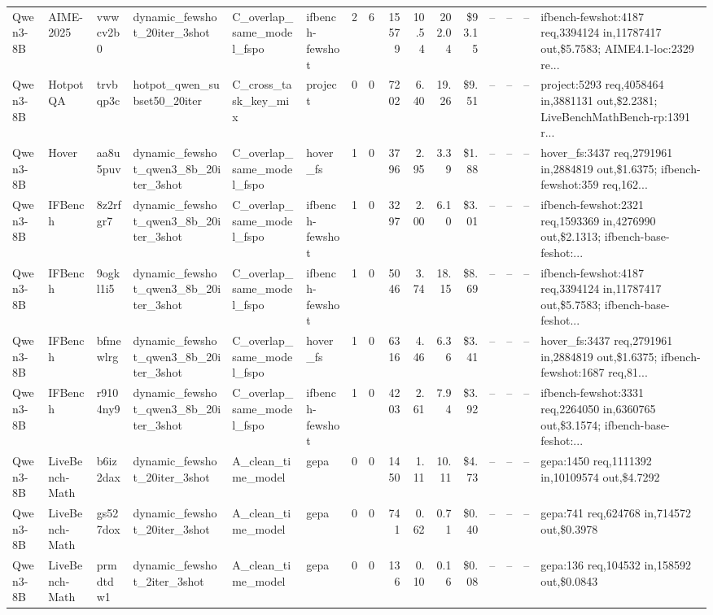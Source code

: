 \begin{landscape}
\begin{table}[htbp]
{\begin{tabular}{@{}llllllllrrrrrlll@{}}
Qwen3-8B & AIME-2025 & vwwcv2b0 & dynamic\_fewshot\_20iter\_3shot & C\_overlap\_same\_model\_fspo & ifbench-fewshot & 2 & 6 & 15579 & 10.54 & 202.04 & \$93.15 & -- & -- & -- & ifbench-fewshot:4187 req,3394124 in,11787417 out,\$5.7583; AIME4.1-loc:2329 re... \\
Qwen3-8B & HotpotQA & trvbqp3c & hotpot\_qwen\_subset50\_20iter & C\_cross\_task\_key\_mix & project & 0 & 0 & 7202 & 6.40 & 19.26 & \$9.51 & -- & -- & -- & project:5293 req,4058464 in,3881131 out,\$2.2381; LiveBenchMathBench-rp:1391 r... \\
Qwen3-8B & Hover & aa8u5puv & dynamic\_fewshot\_qwen3\_8b\_20iter\_3shot & C\_overlap\_same\_model\_fspo & hover\_fs & 1 & 0 & 3796 & 2.95 & 3.39 & \$1.88 & -- & -- & -- & hover\_fs:3437 req,2791961 in,2884819 out,\$1.6375; ifbench-fewshot:359 req,162... \\
Qwen3-8B & IFBench & 8z2rfgr7 & dynamic\_fewshot\_qwen3\_8b\_20iter\_3shot & C\_overlap\_same\_model\_fspo & ifbench-fewshot & 1 & 0 & 3297 & 2.00 & 6.10 & \$3.01 & -- & -- & -- & ifbench-fewshot:2321 req,1593369 in,4276990 out,\$2.1313; ifbench-base-feshot:... \\
Qwen3-8B & IFBench & 9ogkl1i5 & dynamic\_fewshot\_qwen3\_8b\_20iter\_3shot & C\_overlap\_same\_model\_fspo & ifbench-fewshot & 1 & 0 & 5046 & 3.74 & 18.15 & \$8.69 & -- & -- & -- & ifbench-fewshot:4187 req,3394124 in,11787417 out,\$5.7583; ifbench-base-feshot... \\
Qwen3-8B & IFBench & bfmewlrg & dynamic\_fewshot\_qwen3\_8b\_20iter\_3shot & C\_overlap\_same\_model\_fspo & hover\_fs & 1 & 0 & 6316 & 4.46 & 6.36 & \$3.41 & -- & -- & -- & hover\_fs:3437 req,2791961 in,2884819 out,\$1.6375; ifbench-fewshot:1687 req,81... \\
Qwen3-8B & IFBench & r9104ny9 & dynamic\_fewshot\_qwen3\_8b\_20iter\_3shot & C\_overlap\_same\_model\_fspo & ifbench-fewshot & 1 & 0 & 4203 & 2.61 & 7.94 & \$3.92 & -- & -- & -- & ifbench-fewshot:3331 req,2264050 in,6360765 out,\$3.1574; ifbench-base-feshot:... \\
Qwen3-8B & LiveBench-Math & b6iz2dax & dynamic\_fewshot\_20iter\_3shot & A\_clean\_time\_model & gepa & 0 & 0 & 1450 & 1.11 & 10.11 & \$4.73 & -- & -- & -- & gepa:1450 req,1111392 in,10109574 out,\$4.7292 \\
Qwen3-8B & LiveBench-Math & gs527dox & dynamic\_fewshot\_20iter\_3shot & A\_clean\_time\_model & gepa & 0 & 0 & 741 & 0.62 & 0.71 & \$0.40 & -- & -- & -- & gepa:741 req,624768 in,714572 out,\$0.3978 \\
Qwen3-8B & LiveBench-Math & prmdtdw1 & dynamic\_fewshot\_2iter\_3shot & A\_clean\_time\_model & gepa & 0 & 0 & 136 & 0.10 & 0.16 & \$0.08 & -- & -- & -- & gepa:136 req,104532 in,158592 out,\$0.0843 \\

\end{tabular}}
\end{table}
\end{landscape}
